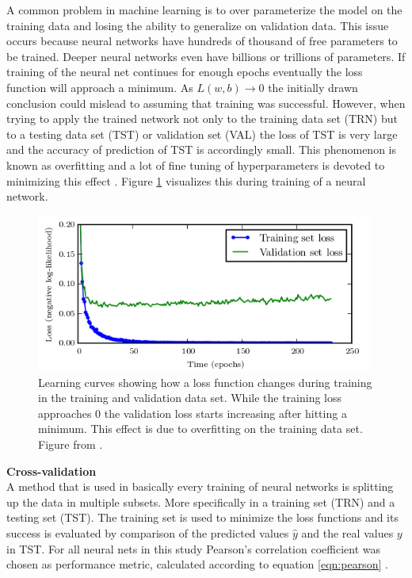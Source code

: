 A common problem in machine learning is to over parameterize the model on the training
data and losing the ability to generalize on validation data. This issue occurs because
neural networks have hundreds of thousand of free parameters to be trained. Deeper neural
networks even have billions or trillions of parameters. If training of the neural net
continues for enough epochs eventually the loss function will approach a minimum. As
$ L(w,b) \rightarrow 0 $ the initially drawn conclusion could mislead to assuming that
training was successful. However, when trying to apply the trained network not only to the
training data set (TRN) but to a testing data set (TST) or validation set (VAL) the loss
of TST is very large and the accuracy of prediction of TST is accordingly small. This
phenomenon is known as overfitting and a lot of fine tuning of hyperparameters is devoted
to minimizing this effect \cite{tetko1995neural}. Figure \ref{fig:overfitting} visualizes
this during training \cite{goodfellow2016deep} of a neural network.

\begin{figure}[H]
  \centering \includegraphics[height=.35\textheight, width=0.99\textwidth]{Figures/overfitting}
  \decoRule
  \caption[Training vs. validation loss over time]{Learning curves showing how a loss function
    changes during training in the training and validation data set. While the training loss
    approaches 0 the validation loss starts increasing after hitting a minimum. This effect is due
    to overfitting on the training data set. Figure from \cite{goodfellow2016deep}.}
 \label{fig:overfitting}
\end{figure}

\textbf{Cross-validation} \\

A method that is used in basically every training of neural networks is splitting up the
data in multiple subsets. More specifically in a training set (TRN) and a testing set
(TST). The training set is used to minimize the loss functions and its success is
evaluated by comparison of the predicted values $\hat{y}$ and the real
values $y$ in TST. For all neural nets in this study Pearson's correlation coefficient
was chosen as performance metric, calculated according to equation \ref{eqn:pearson}
\cite{soper1917distribution}.


